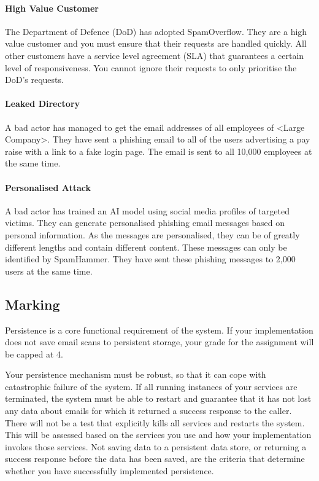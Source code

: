 \documentclass{csse4400}
\begin{document}
\paragraph{High Value Customer}
The Department of Defence (DoD) has adopted SpamOverflow.
They are a high value customer and you must ensure that their requests are handled quickly.
All other customers have a service level agreement (SLA) that guarantees a certain level of responsiveness.
You cannot ignore their requests to only prioritise the DoD's requests.

\paragraph{Leaked Directory}
A bad actor has managed to get the email addresses of all employees of <Large Company>.
They have sent a phishing email to all of the users advertising a pay raise with a link to a fake login page.
The email is sent to all 10,000 employees at the same time.

\paragraph{Personalised Attack}
A bad actor has trained an AI model using social media profiles of targeted victims.
They can generate personalised phishing email messages based on personal information.
As the messages are personalised, they can be of greatly different lengths and contain different content.
These messages can only be identified by SpamHammer.
They have sent these phishing messages to 2,000 users at the same time.

\subsection{Marking}
Persistence is a core functional requirement of the system. If your implementation does not save email scans to persistent storage, your grade for the assignment will be capped at 4.

Your persistence mechanism must be robust, so that it can cope with catastrophic failure of the system. If all running instances of your services are terminated, the system must be able to restart and guarantee that it has not lost any data about emails for which it returned a success response to the caller. There will not be a test that explicitly kills all services and restarts the system. This will be assessed based on the services you use and how your implementation invokes those services. Not saving data to a persistent data store, or returning a success response before the data has been saved, are the criteria that determine whether you have successfully implemented persistence.
\end{document}
